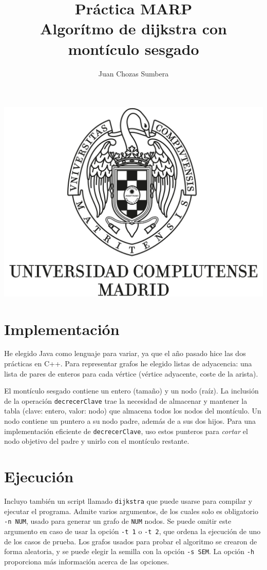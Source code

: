 \documentclass[12pt , a4paper]{article}
\title{Práctica MARP\\Algorítmo de dijkstra con montículo sesgado}
\author{Juan Chozas Sumbera}
\begin{document}
	
	\maketitle
	\begin{center}
		\includegraphics[width=\textwidth]{logo_UCM.jpg}
	\end{center}
	
	\newpage
	
\section{Implementación}
	
	He elegido Java como lenguaje para variar, ya que el año pasado hice las dos prácticas en C++. Para representar grafos he elegido listas de adyacencia: una lista de pares de enteros para cada vértice (vértice adyacente, coste de la arista).
	
	El montículo sesgado contiene un entero (tamaño) y un nodo (raíz). La inclusión de la operación \texttt{decrecerClave} trae la necesidad de almacenar y mantener la tabla (clave: entero, valor: nodo) que almacena todos los nodos del montículo. Un nodo contiene un puntero a su nodo padre, además de a sus dos hijos. Para una implementación eficiente de \texttt{decrecerClave}, uso estos punteros para \textit{cortar} el nodo objetivo del padre y unirlo con el montículo restante.
	
\section{Ejecución}
	Incluyo también un script llamado \texttt{dijkstra} que puede usarse para compilar y ejecutar el programa. Admite varios argumentos, de los cuales solo es obligatorio \texttt{-n NUM}, usado para generar un grafo de \texttt{NUM} nodos. Se puede omitir este argumento en caso de usar la opción \texttt{-t 1} o \texttt{-t 2}, que ordena la ejecución de uno de los casos de prueba. Los grafos usados para probar el algoritmo se crearon de forma aleatoria, y se puede elegir la semilla con la opción \texttt{-s SEM}. La opción \texttt{-h} proporciona más información acerca de las opciones.
	
\end{document}
